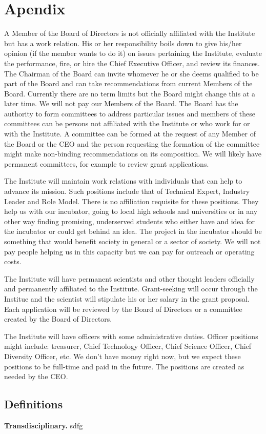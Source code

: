 \section{Apendix}

A Member of the Board of Directors is not officially affiliated with the Institute but has a work relation. His or her responsibility boils down to give his/her opinion (if the member wants to do it) on issues pertaining the Institute, evaluate the performance, fire, or hire the Chief Executive Officer, and review its finances. The Chairman of the Board can invite whomever he or she deems qualified to be part of the Board and can take recommendations from current Members of the Board. Currently there are no term limits but the Board might change this at a later time. We will not pay our Members of the Board. The Board has the authority to form committees to address particular issues and members of these committees can be persons not affiliated with the Institute or who work for or with the Institute. A committee can be formed at the request of any Member of the Board or the CEO and the person requesting the formation of the committee might make non-binding recommendations on its composition. We will likely have permanent committees, for example to review grant applications.

The Institute will maintain work relations with individuals that can help to advance its mission. Such positions include that of Technical Expert, Industry Leader and Role Model. There is no affiliation requisite for these positions. They help us with our incubator, going to local high schools and universities or in any other way finding promising, underserved students who either have and idea for the incubator or could get behind an idea. The project in the incubator should be something that would benefit society in general or a sector of society. We will not pay people helping us in this capacity but we can pay for outreach or operating costs.

The Institute will have permanent scientists and other thought leaders officially and permanently affiliated to the Institute. Grant-seeking will occur through the Institue and the scientist will stipulate his or her salary in the grant proposal. Each application will be reviewed by the Board of Directors or a committee created by the Board of Directors.

The Institute will have officers with some administrative duties. Officer positions might include: treasurer, Chief Technology Officer, Chief Science Officer, Chief Diversity Officer, etc. We don't have money right now, but we expect these positions to be full-time and paid in the future. The positions are created as needed by the CEO. 

\subsection{Definitions}

\textbf{Transdisciplinary.} sdfg